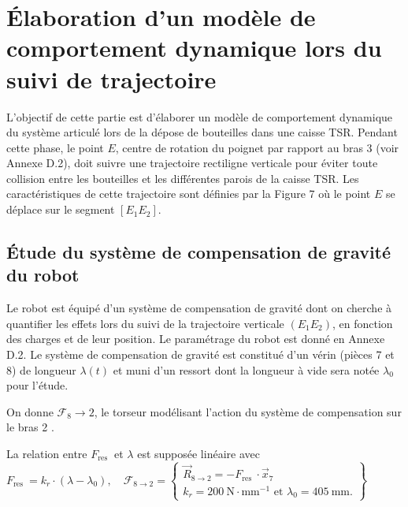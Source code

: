 \section{Élaboration d'un modèle de comportement dynamique lors du suivi de trajectoire}

L'objectif de cette partie est d'élaborer un modèle de comportement dynamique du système articulé lors de la dépose de bouteilles dans une caisse TSR. Pendant cette phase, le point $E$, centre de rotation du poignet par rapport au bras 3 (voir Annexe D.2), doit suivre une trajectoire rectiligne verticale pour éviter toute collision entre les bouteilles et les différentes parois de la caisse TSR. Les caractéristiques de cette trajectoire sont définies par la Figure 7 où le point $E$ se déplace sur le segment $\left[E_{1} E_{2}\right]$.

\subsection*{ Étude du système de compensation de gravité du robot}
Le robot est équipé d'un système de compensation de gravité dont on cherche à quantifier les effets lors du suivi de la trajectoire verticale $\left(E_{1} E_{2}\right)$, en fonction des charges et de leur position. Le paramétrage du robot est donné en Annexe D.2. Le système de compensation de gravité est constitué d'un vérin (pièces 7 et 8) de longueur $\lambda(t)$ et muni d'un ressort dont la longueur à vide sera notée $\lambda_{0}$ pour l'étude.

On donne $\mathscr{F}_{8} \rightarrow 2$, le torseur modélisant l'action du système de compensation sur le bras 2 .

La relation entre $F_{\text {res }}$ et $\lambda$ est supposée linéaire avec $F_{\text {res }}=k_{r} \cdot\left(\lambda-\lambda_{0}\right), \quad \mathscr{F}_{8 \rightarrow 2}=\left\{\begin{array}{c}\vec{R}_{8 \rightarrow 2}=-F_{\text {res }} \cdot \vec{x}_{7} \\ k_{r}=200 \mathrm{~N} \cdot \mathrm{mm}^{-1} \text { et } \lambda_{0}=405 \mathrm{~mm} .\end{array}\right\}$



